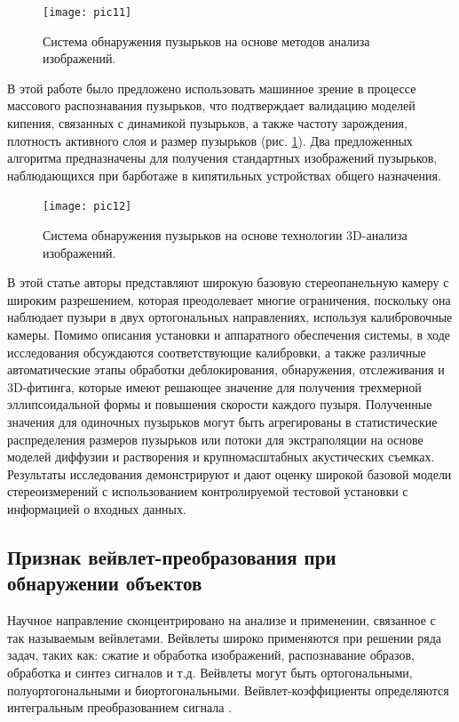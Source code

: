 \documentclass[a4paper,14pt]{extreport}
\begin{document}
\begin{figure}[ht!]
\centering
\texttt{[image: pic11]}
\caption{Система обнаружения пузырьков на основе методов анализа изображений.}
	\label{pic11}
	\end{figure}
	
В этой работе \cite{h15bb} было предложено использовать машинное зрение в процессе массового распознавания пузырьков, что подтверждает валидацию моделей кипения, связанных с динамикой пузырьков, а также частоту зарождения, плотность активного слоя и размер пузырьков (рис. \ref{pic11}). Два предложенных алгоритма предназначены для получения стандартных изображений пузырьков, наблюдающихся при барботаже в кипятильных устройствах общего назначения.

\begin{figure}[ht!]
\centering
\texttt{[image: pic12]}
\caption{Система обнаружения пузырьков на основе технологии 3D-анализа изображений.}
	\label{pic12}
	\end{figure}
	
В этой статье \cite{h16bb} авторы представляют  широкую базовую стереопанельную камеру с широким разрешением, которая преодолевает многие ограничения, поскольку она наблюдает пузыри в двух ортогональных направлениях, используя калибровочные камеры. Помимо описания установки и аппаратного обеспечения системы, в ходе исследования обсуждаются соответствующие калибровки, а также различные автоматические этапы обработки деблокирования, обнаружения, отслеживания и 3D-фитинга, которые имеют решающее значение для получения трехмерной эллипсоидальной формы и повышения скорости каждого пузыря. Полученные значения для одиночных пузырьков могут быть агрегированы в статистические распределения размеров пузырьков или потоки для экстраполяции на основе моделей диффузии и растворения и крупномасштабных акустических съемках. Результаты исследования демонстрируют и дают оценку широкой базовой модели стереоизмерений с использованием контролируемой тестовой установки с информацией о входных данных.

\subsection{Признак вейвлет-преобразования при обнаружении объектов}
Научное направление сконцентрировано на анализе и применении, связанное с так называемым вейвлетами. Вейвлеты широко применяются  при решении ряда задач, таких как: сжатие и обработка изображений, распознавание образов, обработка и синтез сигналов и т.д. Вейвлеты могут быть ортогональными, полуортогональными и биортогональными. Вейвлет-коэффициенты определяются интегральным преобразованием сигнала \cite{1wl}.
\end{document}
